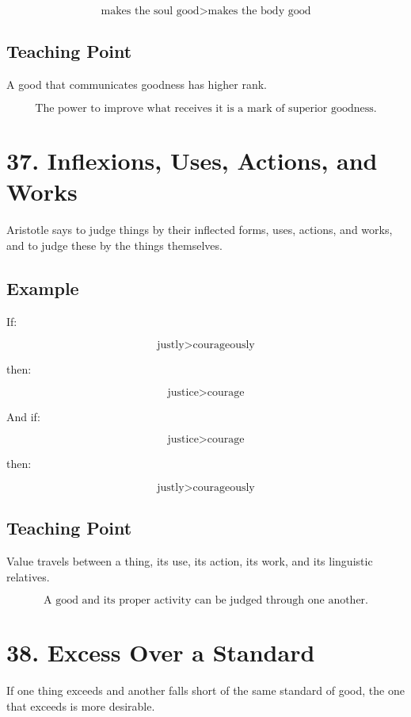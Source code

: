 \documentclass[12pt]{article}
\begin{document}
\[
\text{makes the soul good} > \text{makes the body good}
\]

\subsection*{Teaching Point}

A good that communicates goodness has higher rank.

\[
\boxed{
\text{The power to improve what receives it is a mark of superior goodness.}
}
\]

\section*{37. Inflexions, Uses, Actions, and Works}

Aristotle says to judge things by their inflected forms, uses, actions, and
works, and to judge these by the things themselves.

\subsection*{Example}

If:

\[
\text{justly} > \text{courageously}
\]

then:

\[
\text{justice} > \text{courage}
\]

And if:

\[
\text{justice} > \text{courage}
\]

then:

\[
\text{justly} > \text{courageously}
\]

\subsection*{Teaching Point}

Value travels between a thing, its use, its action, its work, and its linguistic
relatives.

\[
\boxed{
\text{A good and its proper activity can be judged through one another.}
}
\]

\section*{38. Excess Over a Standard}

If one thing exceeds and another falls short of the same standard of good, the
one that exceeds is more desirable.
\end{document}
